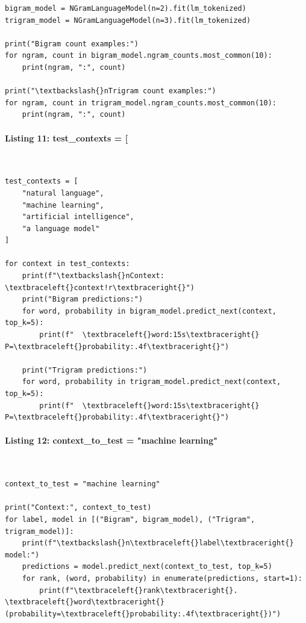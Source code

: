 \documentclass[12pt,a4paper,oneside]{report}
\begin{document}
\begin{Verbatim}[commandchars=\\\{\},breaklines=true,breakanywhere=true,fontsize=\scriptsize,frame=leftline,framesep=2mm,rulecolor=\color{gray}]
bigram_model = NGramLanguageModel(n=2).fit(lm_tokenized)
trigram_model = NGramLanguageModel(n=3).fit(lm_tokenized)

print("Bigram count examples:")
for ngram, count in bigram_model.ngram_counts.most_common(10):
    print(ngram, ":", count)

print("\textbackslash{}nTrigram count examples:")
for ngram, count in trigram_model.ngram_counts.most_common(10):
    print(ngram, ":", count)
\end{Verbatim}
\paragraph{Listing 11: test\_contexts = [}\mbox{}\\[-1ex]
\begin{Verbatim}[commandchars=\\\{\},breaklines=true,breakanywhere=true,fontsize=\scriptsize,frame=leftline,framesep=2mm,rulecolor=\color{gray}]
test_contexts = [
    "natural language",
    "machine learning",
    "artificial intelligence",
    "a language model"
]

for context in test_contexts:
    print(f"\textbackslash{}nContext: \textbraceleft{}context!r\textbraceright{}")
    print("Bigram predictions:")
    for word, probability in bigram_model.predict_next(context, top_k=5):
        print(f"  \textbraceleft{}word:15s\textbraceright{} P=\textbraceleft{}probability:.4f\textbraceright{}")

    print("Trigram predictions:")
    for word, probability in trigram_model.predict_next(context, top_k=5):
        print(f"  \textbraceleft{}word:15s\textbraceright{} P=\textbraceleft{}probability:.4f\textbraceright{}")
\end{Verbatim}
\paragraph{Listing 12: context\_to\_test = "machine learning"}\mbox{}\\[-1ex]
\begin{Verbatim}[commandchars=\\\{\},breaklines=true,breakanywhere=true,fontsize=\scriptsize,frame=leftline,framesep=2mm,rulecolor=\color{gray}]
context_to_test = "machine learning"

print("Context:", context_to_test)
for label, model in [("Bigram", bigram_model), ("Trigram", trigram_model)]:
    print(f"\textbackslash{}n\textbraceleft{}label\textbraceright{} model:")
    predictions = model.predict_next(context_to_test, top_k=5)
    for rank, (word, probability) in enumerate(predictions, start=1):
        print(f"\textbraceleft{}rank\textbraceright{}. \textbraceleft{}word\textbraceright{}  (probability=\textbraceleft{}probability:.4f\textbraceright{})")
\end{Verbatim}
\end{document}
